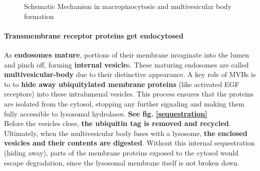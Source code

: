 \documentclass[../main.tex]{subfiles}
\begin{document}
\begin{figure}[H]
	\centering
	\caption{Schematic Mechanism in macropinocytosis and multivesicular body formation}
\end{figure}

\paragraph{Transmembrane receptor proteins get endocytosed}

As \textbf{endosomes mature}, portions of their membrane invaginate into the lumen and pinch off, forming \textbf{internal vesicle}s. These maturing endosomes are called \textbf{\gls{multivesicular-body}} due to their distinctive appearance. A key role of MVBs is to to \textbf{hide away ubiquitylated membrane proteins} (like activated EGF receptors) into these intralumenal vesicles. This process ensures that the proteins are isolated from the cytosol, stopping any further signaling and making them fully accessible to lysosomal hydrolases. \textbf{See fig. \ref{sequestration}} \\
\indent Before the vesicles close, \textbf{the ubiquitin tag is removed and recycled}. Ultimately, when the multivesicular body fuses with a lysosome, \textbf{the enclosed vesicles and their contents are digested}. Without this internal sequestration (hiding away), parts of the membrane proteins exposed to the cytosol would escape degradation, since the lysosomal membrane itself is not broken down.
\end{document}
